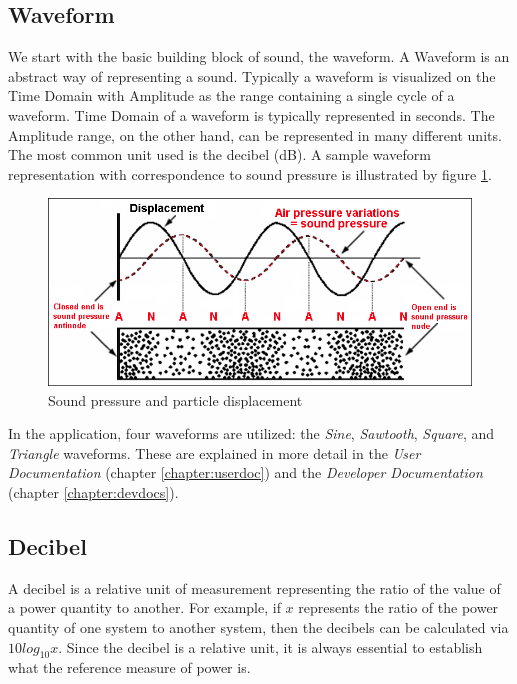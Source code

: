 \documentclass[a4paper,12pt]{report}
\begin{document}
\subsection{Waveform}
\label{subsec:waveform}
We start with the basic building block of sound, the waveform. A Waveform is an abstract way of representing a sound. Typically a waveform is visualized on the Time Domain with Amplitude as the range containing a single cycle of a waveform. Time Domain of a waveform is typically represented in seconds. The Amplitude range, on the other hand, can be represented in many different units. The most common unit used is the decibel (dB). A sample waveform representation with correspondence to sound pressure is illustrated by figure \ref{fig:particledisplacementsoundpressure}.

\begin{figure}
    \centering
    \includegraphics[width=32em]{ParticleDisplacement-SoundPressure-Node-Antinode.png}
    \caption{Sound pressure and particle displacement}
    \label{fig:particledisplacementsoundpressure}
\end{figure}

In the application, four waveforms are utilized: the \emph{Sine}, \emph{Sawtooth}, \emph{Square}, and \emph{Triangle} waveforms. These are explained in more detail in the \emph{User Documentation} (chapter \ref{chapter:userdoc}) and the \emph{Developer Documentation} (chapter \ref{chapter:devdocs}).

\subsection{Decibel}
\label{subsec:decibel}
A decibel is a relative unit of measurement representing the ratio of the value of a power quantity to another. For example, if $x$ represents the ratio of the power quantity of one system to another system, then the decibels can be calculated via $10 log_10 x$. Since the decibel is a relative unit, it is always essential to establish what the reference measure of power is. 
\end{document}
